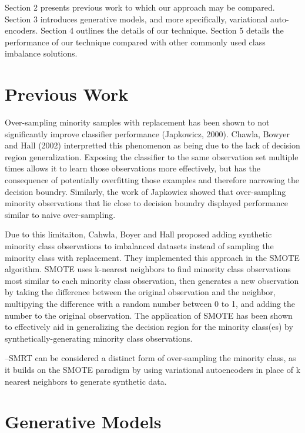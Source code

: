 \documentclass[twoside,11pt]{article}
\begin{document}
Section 2 presents previous work to which our approach may be compared. Section 3 introduces generative models, and more specifically, variational auto-encoders. Section 4 outlines the details of our technique. Section 5 details the performance of our technique compared with other commonly used class imbalance solutions. \\

\section{Previous Work}

Over-sampling minority samples with replacement has been shown to not significantly improve classifier performance (Japkowicz, 2000).  Chawla, Bowyer and Hall (2002) interpretted this phenomenon as being due to the lack of decision region generalization. Exposing the classifier to the same observation set multiple times allows it to learn those observations more effectively, but has the consequence of potentially overfitting those examples and therefore narrowing the decision boundry. Similarly, the work of Japkowicz showed that over-sampling minority observations that lie close to decision boundry displayed performance similar to naive over-sampling.

Due to this limitaiton, Cahwla, Boyer and Hall proposed adding synthetic minority class observations to imbalanced datasets instead of sampling the minority class with replacement.  They implemented this approach in the SMOTE algorithm. SMOTE uses k-nearest neighbors to find minority class observations most similar to each minority class observation, then generates a new observation by taking the difference between the original observation and the neighbor, multipying the difference with a random number between 0 to 1, and adding the number to the original observation. The application of SMOTE has been shown to effectively aid in generalizing the decision region for the minority class(es) by synthetically-generating minority class observations.  

--SMRT can be considered a distinct form of over-sampling the minority class, as it builds on the SMOTE paradigm by using variational autoencoders in place of k nearest neighbors to generate synthetic data. 

\section{Generative Models}
\end{document}
